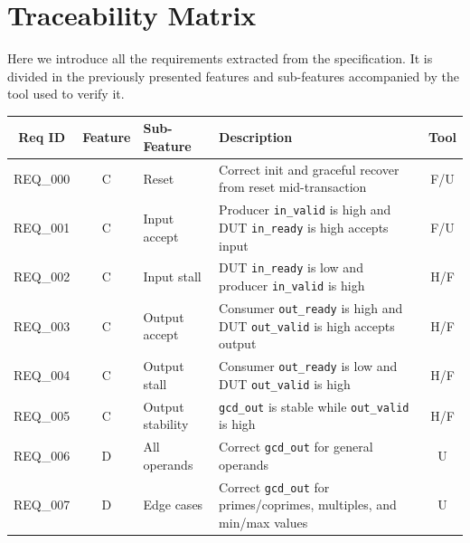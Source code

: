\section{Traceability Matrix}

Here we introduce all the requirements extracted from the specification.
It is divided in the previously presented features and sub-features accompanied by the tool used to verify it.
\begin{table}[H]
    \centering
    \begin{tabularx}{\textwidth}{|c|c|l|X|c|}
        \toprule
        \textbf{Req ID} & \textbf{Feature}  & \textbf{Sub-Feature}  & \textbf{Description}                                                                      & \textbf{Tool} \\ \midrule
        REQ\_000        & C                 & Reset                 & Correct init and graceful recover from reset mid-transaction                              & F/U           \\ \midrule
        REQ\_001        & C                 & Input accept          & Producer \texttt{in\_valid} is high and DUT \texttt{in\_ready} is high accepts input      & F/U           \\ \midrule
        REQ\_002        & C                 & Input stall           & DUT \texttt{in\_ready} is low and producer \texttt{in\_valid} is high                     & H/F           \\ \midrule
        REQ\_003        & C                 & Output accept         & Consumer \texttt{out\_ready} is high and DUT \texttt{out\_valid} is high accepts output   & H/F           \\ \midrule
        REQ\_004        & C                 & Output stall          & Consumer \texttt{out\_ready} is low and DUT \texttt{out\_valid} is high                   & H/F           \\ \midrule
        REQ\_005        & C                 & Output stability      & \texttt{gcd\_out} is stable while \texttt{out\_valid} is high                             & H/F           \\ \bottomrule \toprule
        REQ\_006        & D                 & All operands          & Correct \texttt{gcd\_out} for general operands                                            & U             \\ \midrule
        REQ\_007        & D                 & Edge cases            & Correct \texttt{gcd\_out} for primes/coprimes, multiples, and min/max values              & U             \\ \midrule

\end{tabularx}
\end{table}

